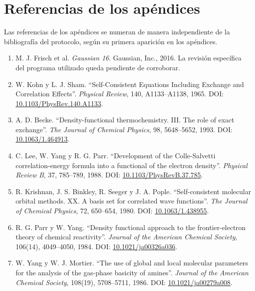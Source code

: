 \documentclass[12 pt, letter, oneside]{book}
\begin{document}
\chapter*{Referencias de los apéndices}
{}
Las referencias de los apéndices se numeran de manera independiente de la bibliografía del protocolo, según su primera aparición en los apéndices.
\begingroup
\renewcommand{\labelenumi}{[\arabic{enumi}]}
\begin{enumerate}
\setlength{\itemsep}{0.65\baselineskip}
\item\label{anexo-ref-1} M. J. Frisch et al. \textit{Gaussian 16}. Gaussian, Inc., 2016. La revisión específica del programa utilizado queda pendiente de corroborar.

\item\label{anexo-ref-2} W. Kohn y L. J. Sham. ``Self-Consistent Equations Including Exchange and Correlation Effects''. \textit{Physical Review}, 140, A1133--A1138, 1965. DOI: \href{https://doi.org/10.1103/PhysRev.140.A1133}{10.1103/PhysRev.140.A1133}.

\item\label{anexo-ref-3} A. D. Becke. ``Density-functional thermochemistry. III. The role of exact exchange''. \textit{The Journal of Chemical Physics}, 98, 5648--5652, 1993. DOI: \href{https://doi.org/10.1063/1.464913}{10.1063/1.464913}.

\item\label{anexo-ref-4} C. Lee, W. Yang y R. G. Parr. ``Development of the Colle-Salvetti correlation-energy formula into a functional of the electron density''. \textit{Physical Review B}, 37, 785--789, 1988. DOI: \href{https://doi.org/10.1103/PhysRevB.37.785}{10.1103/PhysRevB.37.785}.

\item\label{anexo-ref-5} R. Krishnan, J. S. Binkley, R. Seeger y J. A. Pople. ``Self-consistent molecular orbital methods. XX. A basis set for correlated wave functions''. \textit{The Journal of Chemical Physics}, 72, 650--654, 1980. DOI: \href{https://doi.org/10.1063/1.438955}{10.1063/1.438955}.

\item\label{anexo-ref-6} R. G. Parr y W. Yang. ``Density functional approach to the frontier-electron theory of chemical reactivity''. \textit{Journal of the American Chemical Society}, 106(14), 4049--4050, 1984. DOI: \href{https://doi.org/10.1021/ja00326a036}{10.1021/ja00326a036}.

\item\label{anexo-ref-7} W. Yang y W. J. Mortier. ``The use of global and local molecular parameters for the analysis of the gas-phase basicity of amines''. \textit{Journal of the American Chemical Society}, 108(19), 5708--5711, 1986. DOI: \href{https://doi.org/10.1021/ja00279a008}{10.1021/ja00279a008}.


\end{enumerate}
\end{document}
